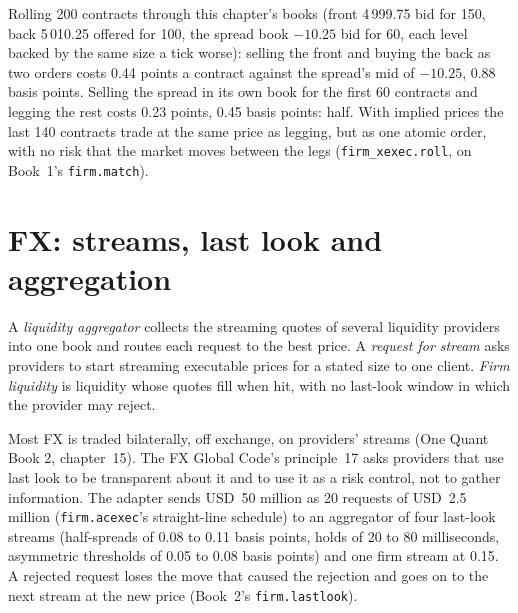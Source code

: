 Rolling 200 contracts through this chapter's books (front 4\,999.75 bid for 150, back 5\,010.25 offered for 100, the spread book $-10.25$ bid for 60,
each level backed by the same size a tick worse): selling the front and buying the back as two orders costs 0.44 points a contract against the
spread's mid of $-10.25$, 0.88 basis points. Selling the spread in its own book for the first 60 contracts and legging the rest costs 0.23 points, 0.45
basis points: half. With implied prices the last 140 contracts trade at the same price as legging, but as one atomic order, with no risk that the
market moves between the legs (\texttt{firm\_xexec.roll}, on Book~1's \texttt{firm.match}).

\label{lst:mx:execution-beyond-equities:roll}

\section{FX: streams, last look and aggregation}

\begin{definition}\label{def:mx:execution-beyond-equities:aggregator}
A \emph{liquidity aggregator} collects the streaming quotes of several liquidity providers into one book and routes each
request to the best price. A \emph{request for stream} asks providers to start streaming executable prices for a stated size
to one client. \emph{Firm liquidity} is liquidity whose quotes fill when hit, with no last-look window in which the provider may
reject.
\end{definition}

Most FX is traded bilaterally, off exchange, on providers' streams (One Quant Book 2, chapter~15). The FX Global Code's principle~17 asks providers
that use last look to be transparent about it and to use it as a risk control, not to gather information. The adapter sends USD~50 million as 20
requests of USD~2.5 million (\texttt{firm.acexec}'s straight-line schedule) to an aggregator of four last-look streams (half-spreads of 0.08 to 0.11
basis points, holds of 20 to 80 milliseconds, asymmetric thresholds of 0.05 to 0.08 basis points) and one firm stream at 0.15. A rejected request loses
the move that caused the rejection and goes on to the next stream at the new price (Book~2's \texttt{firm.lastlook}).

